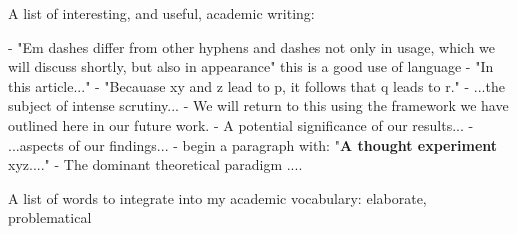 A list of interesting, and useful, academic writing:

- "Em dashes differ from other hyphens and dashes not only in usage, which we will discuss shortly, but also in appearance" this is a good use of language
- "In this article..."
- "Becauase xy and z lead to p, it follows that q leads to r."
- ...the subject of intense scrutiny...
- We will return to this using the framework we have outlined here in our future work.
- A potential significance of our results...
- ...aspects of our findings...
- begin a paragraph with: "\textbf{A thought experiment} xyz...." 
- The dominant theoretical paradigm ....

A list of words to integrate into my academic vocabulary: elaborate, problematical